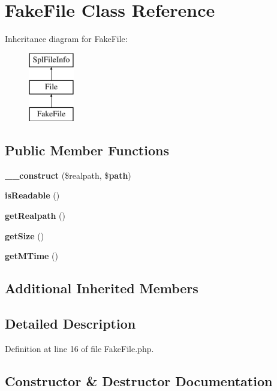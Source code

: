 \section{Fake\+File Class Reference}
\label{class_symfony_1_1_component_1_1_http_foundation_1_1_tests_1_1_file_1_1_fake_file}
Inheritance diagram for Fake\+File\+:\begin{figure}[H]
\begin{center}
\leavevmode
\includegraphics[height=3.000000cm]{class_symfony_1_1_component_1_1_http_foundation_1_1_tests_1_1_file_1_1_fake_file}
\end{center}
\end{figure}
\subsection*{Public Member Functions}
\begin{DoxyCompactItemize}
\item 
{\bf \+\_\+\+\_\+construct} (\$realpath, \${\bf path})
\item 
{\bf is\+Readable} ()
\item 
{\bf get\+Realpath} ()
\item 
{\bf get\+Size} ()
\item 
{\bf get\+M\+Time} ()
\end{DoxyCompactItemize}
\subsection*{Additional Inherited Members}


\subsection{Detailed Description}


Definition at line 16 of file Fake\+File.\+php.



\subsection{Constructor \& Destructor Documentation}

